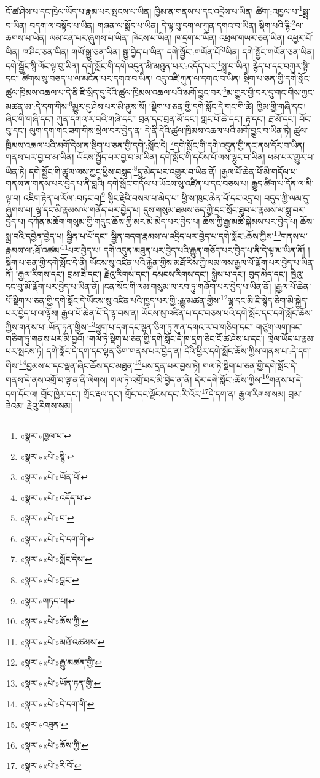 ངོ་ཚ་ཤེས་པ་དང་ཁྲེལ་ཡོད་པ་རྣམ་པར་སྤངས་པ་ཡིན། ཁྱིམ་ན་གནས་པ་དང་འདྲེས་པ་ཡིན། ཚིག་:འཁྱལ་པ་\footnote{«སྣར་»ཁྱལ་པ་}སྨྲ་བ་ཡིན། བདག་ལ་བསྟོད་པ་ཡིན། གཞན་ལ་སྨོད་པ་ཡིན། དེ་ལྟ་བུ་དག་ལ་ཀུན་དགའ་བ་ཡིན། སྡིག་པའི་རྙི་\footnote{«སྣར་»«པེ་»སྙི་}ལ་ཆགས་པ་ཡིན། ལམ་ངན་པར་ཞུགས་པ་ཡིན། ཁེངས་པ་ཡིན། ཁ་དྲག་པ་ཡིན། འཕྲལ་གཡར་ཅན་ཡིན། འཕྱར་པོ་ཡིན། ཁ་ཤིང་ཅན་ཡིན། གཡོ་སྒྱུ་ཅན་ཡིན། སྒྱུ་བྱེད་པ་ཡིན། དགེ་སྦྱོང་:གཡོན་པོ་\footnote{«སྣར་»«པེ་»ཡོན་པོ་}ཡིན། དགེ་སྦྱོང་གཡོན་ཅན་ཡིན། དགེ་སྦྱོང་སྙི་ལོང་ལྟ་བུ་ཡིན། དགེ་སློང་གི་དགེ་འདུན་མི་མཐུན་པར་:འདོད་པར་\footnote{«སྣར་»«པེ་»འདོད་པ་}སྨྲ་བ་ཡིན། རྙེད་པ་དང་བཀུར་སྟི་དང་། ཚིགས་སུ་བཅད་པ་ལ་མངོན་པར་དགའ་བ་ཡིན། འདུ་འཛི་ཀུན་ལ་དགའ་བ་ཡིན། སྡིག་པ་ཅན་གྱི་དགེ་སློང་ཚུལ་ཁྲིམས་འཆལ་པ་དེ་ནི་ཇི་སྲིད་དུ་དེའི་ཚུལ་ཁྲིམས་འཆལ་པའི་མགོ་བྱུང་བར་\footnote{«སྣར་»«པེ་»བ་}མ་གྱུར་གྱི་བར་དུ་གང་གིས་ཀྱང་མཚན་མ་:དེ་དག་གིས་\footnote{«སྣར་»«པེ་»དེ་དག་གི་}མྱུར་དུ་ཤེས་པར་མི་ནུས་སོ། །སྡིག་པ་ཅན་གྱི་དགེ་སློང་དེ་གང་གི་ཚེ། ཁྱིམ་གྱི་གཞི་དང་། ཞིང་གི་གཞི་དང་། ཀུན་དགའ་ར་བའི་གཞི་དང་། བྲན་དང་བྲན་མོ་དང་། གླང་པོ་ཆེ་དང་། རྟ་དང་། རྔ་མོ་དང་། བོང་བུ་དང་། ལུག་དག་གང་ཟག་གིས་སྲེལ་བར་བྱེད་ན། དེ་ནི་དེའི་ཚུལ་ཁྲིམས་འཆལ་པའི་མགོ་བྱུང་བ་ཡིན་ཏེ། ཚུལ་ཁྲིམས་འཆལ་པའི་མགོ་དེས་ན་སྡིག་པ་ཅན་གྱི་དགེ་:སློང་དེ། \footnote{«སྣར་»«པེ་»སློང་དེས་}དགེ་སློང་གི་དགེ་འདུན་གྱི་ནང་ནས་དོར་བ་ཡིན། གནས་པར་བྱ་བ་མ་ཡིན། ལོངས་སྤྱོད་པར་བྱ་བ་མ་ཡིན། དགེ་སློང་གི་དངོས་པོ་ལས་ལྷུང་བ་ཡིན། ཕམ་པར་གྱུར་པ་ཡིན་ཏེ། དགེ་སྦྱོང་གི་ཚུལ་ལས་ཀྱང་ཕྱིས་བསླད་\footnote{«སྣར་»«པེ་»བླང་}དུ་མེད་པར་འགྱུར་བ་ཡིན་ནོ། །རྒྱལ་པོ་ཆེན་པོ་མི་གདོལ་པ་གནས་ན་གནས་པར་བྱེད་པ་ནི་བླའི། དགེ་སློང་གདོལ་པ་ཡོངས་སུ་འཛིན་པ་དང་བཅས་པ། རྒྱུད་ཚིག་པ་དོན་ལ་མི་ལྟ་བ། འཇིག་རྟེན་ཕ་རོལ་:བཏང་བ།\footnote{«སྣར་»གཏད་པ།} སྙིང་རྗེའི་བསམ་པ་མེད་པ། ཕྱི་ས་ཁུང་ཆེན་པོ་དང་འདྲ་བ། བདུད་ཀྱི་ལམ་དུ་ཞུགས་པ། ལྷ་དང་མི་རྣམས་ལ་གནོད་པར་བྱེད་པ། དུས་གསུམ་ཐམས་ཅད་ཀྱི་དྲང་སྲོང་ཐུབ་པ་རྣམས་ལ་སླུ་བར་བྱེད་པ། དཀོན་མཆོག་གསུམ་གྱི་གདུང་ཆོས་ཀྱི་མར་མེ་མེད་པར་བྱེད་པ། ཆོས་ཀྱི་རྒྱ་མཚོ་སྐེམས་པར་བྱེད་པ། ཆོས་སྨྲ་བའི་དབྱེན་བྱེད་པ། སྦྱིན་པ་པོ་དང་། སྦྱིན་བདག་རྣམས་ལ་འདྲིད་པར་བྱེད་པ་དགེ་སློང་:ཆོས་ཀྱིས་\footnote{«སྣར་»«པེ་»ཆོས་ཀྱི་}གནས་པ་རྣམས་ལ་:ཐོ་འཚམ་\footnote{«སྣར་»«པེ་»མཐོ་འཚམས་}པར་བྱེད་པ། དགེ་འདུན་མཐུན་པར་བྱེད་པའི་རྒྱུན་གཅོད་པར་བྱེད་པ་ནི་དེ་ལྟ་མ་ཡིན་ནོ། །སྡིག་པ་ཅན་གྱི་དགེ་སློང་དེ་ནི། ཡོངས་སུ་འཛིན་པའི་རྐྱེན་གྱིས་མཐོ་རིས་ཀྱི་ལམ་ལས་རྒྱལ་པོ་ལྡོག་པར་བྱེད་པ་ཡིན་ནོ། །རྒྱལ་རིགས་དང་། བྲམ་ཟེ་དང་། རྗེའུ་རིགས་དང་། དམངས་རིགས་དང་། སྐྱེས་པ་དང་། བུད་མེད་དང་། ཁྱེའུ་དང་བུ་མོ་ལྡོག་པར་བྱེད་པ་ཡིན་ནོ། །ངན་སོང་གི་ལམ་གསུམ་ལ་རབ་ཏུ་གཞོག་པར་བྱེད་པ་ཡིན་ནོ། །རྒྱལ་པོ་ཆེན་པོ་སྡིག་པ་ཅན་གྱི་དགེ་སློང་དེ་ཡོངས་སུ་འཛིན་པའི་ཁྱད་པར་གྱི་:རྒྱུ་མཚན་གྱིས་\footnote{«སྣར་»«པེ་»རྒྱུ་མཚན་གྱི་}ལྷ་དང་མི་ཇི་སྙེད་ཅིག་མི་སྐྱེད་པར་བྱེད་པ་ལ་ལྟོས། རྒྱལ་པོ་ཆེན་པོ་དེ་ལྟ་བས་ན། ཡོངས་སུ་འཛིན་པ་དང་བཅས་པའི་དགེ་སློང་དང་དགེ་སློང་ཆོས་ཀྱིས་གནས་པ་:ཡོན་ཏན་གྱིས་\footnote{«སྣར་»«པེ་»ཡོན་ཏན་གྱི་}ཕྱུག་པ་དག་དང་ལྷན་ཅིག་ཏུ་ཀུན་དགའ་ར་བ་གཅིག་དང་། གཙུག་ལག་ཁང་གཅིག་ཏུ་གནས་པར་མི་བྱའོ། །གལ་ཏེ་སྡིག་པ་ཅན་གྱི་དགེ་སློང་དེ་ཁ་དྲག་ཅིང་ངོ་ཚ་ཤེས་པ་དང་། ཁྲེལ་ཡོད་པ་རྣམ་པར་སྤངས་ཏེ། དགེ་སློང་དེ་དག་དང་ལྷན་ཅིག་གནས་པར་བྱེད་ན། དེའི་ཕྱིར་དགེ་སློང་ཆོས་ཀྱིས་གནས་པ་:དེ་དག་གིས་\footnote{«སྣར་»«པེ་»དེ་དག་གི་}བྱམས་པ་དང་ལྡན་ཞིང་ཆོས་དང་མཐུན་\footnote{«སྣར་»འཐུན་}པས་དྲན་པར་བྱས་ཏེ། གལ་ཏེ་སྡིག་པ་ཅན་གྱི་དགེ་སློང་དེ་གནས་དེ་ནས་འགྲོ་བ་ལྟ་ན་ནི་ལེགས། གལ་ཏེ་འགྲོ་བར་མི་བྱེད་ན་ནི། དེར་དགེ་སློང་:ཆོས་ཀྱིས་\footnote{«སྣར་»«པེ་»ཆོས་ཀྱི་}གནས་པ་དེ་དག་དོང་ལ། གྲོང་ཁྱེར་དང་། གྲོང་རྡལ་དང་། གྲོང་དང་ལྗོངས་དང་:རི་འོར་\footnote{«སྣར་»«པེ་»རི་བོ་}དེ་དག་ན། རྒྱལ་རིགས་སམ། བྲམ་ཟེའམ། རྗེའུ་རིགས་སམ། 